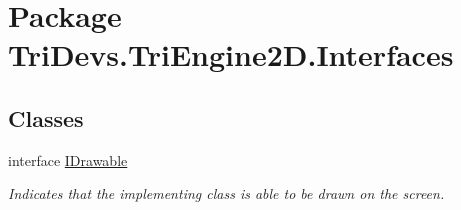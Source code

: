 \hypertarget{namespace_tri_devs_1_1_tri_engine2_d_1_1_interfaces}{\section{Package Tri\-Devs.\-Tri\-Engine2\-D.\-Interfaces}
\label{namespace_tri_devs_1_1_tri_engine2_d_1_1_interfaces}
}
\subsection*{Classes}
\begin{DoxyCompactItemize}
\item 
interface \hyperlink{interface_tri_devs_1_1_tri_engine2_d_1_1_interfaces_1_1_i_drawable}{I\-Drawable}
\begin{DoxyCompactList}\small\item\em Indicates that the implementing class is able to be drawn on the screen. \end{DoxyCompactList}\end{DoxyCompactItemize}
